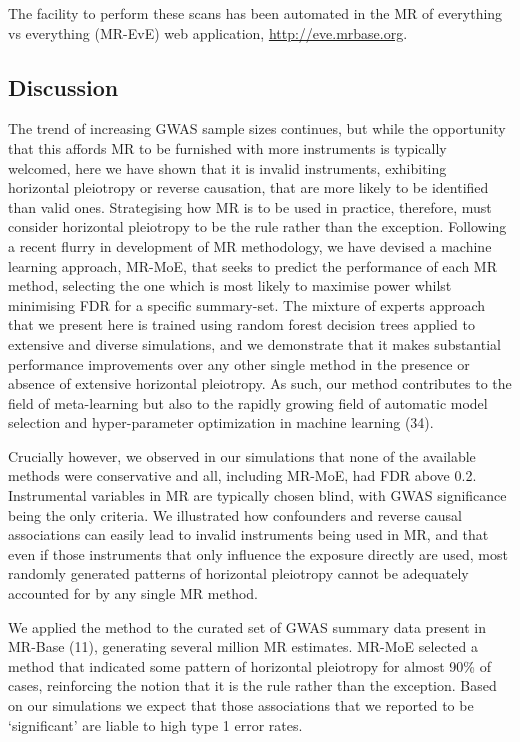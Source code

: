 \documentclass[]{article}
\begin{document}
The facility to perform these scans has been automated in the MR of
everything vs everything (MR-EvE) web application,
\url{http://eve.mrbase.org}.

\subsection{Discussion}\label{discussion}

The trend of increasing GWAS sample sizes continues, but while the
opportunity that this affords MR to be furnished with more instruments
is typically welcomed, here we have shown that it is invalid
instruments, exhibiting horizontal pleiotropy or reverse causation, that
are more likely to be identified than valid ones. Strategising how MR is
to be used in practice, therefore, must consider horizontal pleiotropy
to be the rule rather than the exception. Following a recent flurry in
development of MR methodology, we have devised a machine learning
approach, MR-MoE, that seeks to predict the performance of each MR
method, selecting the one which is most likely to maximise power whilst
minimising FDR for a specific summary-set. The mixture of experts
approach that we present here is trained using random forest decision
trees applied to extensive and diverse simulations, and we demonstrate
that it makes substantial performance improvements over any other single
method in the presence or absence of extensive horizontal pleiotropy. As
such, our method contributes to the field of meta-learning but also to
the rapidly growing field of automatic model selection and
hyper-parameter optimization in machine learning (34).

Crucially however, we observed in our simulations that none of the
available methods were conservative and all, including MR-MoE, had FDR
above 0.2. Instrumental variables in MR are typically chosen blind, with
GWAS significance being the only criteria. We illustrated how
confounders and reverse causal associations can easily lead to invalid
instruments being used in MR, and that even if those instruments that
only influence the exposure directly are used, most randomly generated
patterns of horizontal pleiotropy cannot be adequately accounted for by
any single MR method.

We applied the method to the curated set of GWAS summary data present in
MR-Base (11), generating several million MR estimates. MR-MoE selected a
method that indicated some pattern of horizontal pleiotropy for almost
90\% of cases, reinforcing the notion that it is the rule rather than
the exception. Based on our simulations we expect that those
associations that we reported to be `significant' are liable to high
type 1 error rates.
\end{document}
